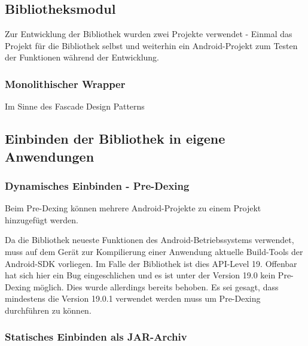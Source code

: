 \subsection{Bibliotheksmodul}

Zur Entwicklung der Bibliothek wurden zwei Projekte verwendet - Einmal das Projekt für die Bibliothek selbst und weiterhin ein Android-Projekt zum Testen der Funktionen während der Entwicklung. 

\subsubsection{Monolithischer Wrapper}
Im Sinne des Fascade Design Patterns 

\subsection{Einbinden der Bibliothek in eigene Anwendungen}

\subsubsection{Dynamisches Einbinden - Pre-Dexing}

Beim Pre-Dexing können mehrere Android-Projekte zu einem Projekt hinzugefügt werden. 

Da die Bibliothek neueste Funktionen des Android-Betriebssystems verwendet, muss auf dem  Gerät zur Kompilierung einer Anwendung aktuelle Build-Tools der Android-SDK vorliegen. Im Falle der Bibliothek ist dies API-Level 19. Offenbar hat sich hier ein Bug eingeschlichen und es ist unter der Version 19.0 kein Pre-Dexing möglich. Dies wurde allerdings bereits behoben. Es sei gesagt, dass mindestens die Version 19.0.1 verwendet werden muss um Pre-Dexing durchführen zu können.

\subsubsection{Statisches Einbinden als JAR-Archiv}
